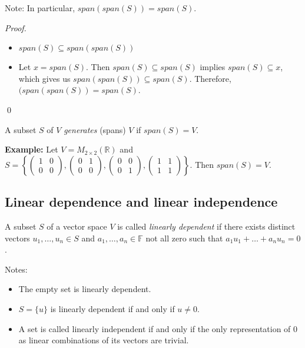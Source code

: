 \documentclass[12pt]{article}
\newenvironment{definition}[2][Definition]{\begin{trivlist}
\item[\hskip \labelsep {\bfseries #1}\hskip \labelsep {\bfseries #2}]}{\end{trivlist}}
\newenvironment{sol}
    {\emph{Proof.}
    }
    {
    \qed
    }
\begin{document}
\noindent Note: In particular, $span(span(S)) = span(S)$.

\begin{sol}
\begin{itemize}
    \item[(a)] $span(S) \subseteq span(span(S))$
    
    \item[(b)] Let $x = span(S)$. Then $span(S) \subseteq span(S)$ implies $span(S) \subseteq x$, which gives us $span(span(S)) \subseteq span(S)$. Therefore, $(span(span(S)) = span(S)$.
\end{itemize}
\end{sol}

\begin{definition}{6}
A subset $S$ of $V$ \textit{generates} (spans) $V$ if $span(S) = V$.
\end{definition}

\noindent\textbf{Example:} Let $V = M_{2 \times 2}(\mathbb{R})$ and $S = \left\{\begin{pmatrix}
1 & 0 \\
0 & 0
\end{pmatrix}, \begin{pmatrix}
0 & 1\\
0 & 0
\end{pmatrix}, 
\begin{pmatrix}
0 & 0\\
0 & 1
\end{pmatrix}, 
\begin{pmatrix}
1 & 1\\
1 & 1
\end{pmatrix}\right\}$. Then $span(S) = V$.

\subsection{Linear dependence and linear independence}

\begin{definition}{7}
A subset $S$ of a vector space $V$ is called \textit{linearly dependent} if there exists distinct vectors $u_1, \dots, u_n \in S$ and $a_1, \dots, a_n \in \mathbb{F}$ not all zero such that $a_1u_1 + \dots + a_nu_n = 0$.
\end{definition}

\noindent Notes:
\begin{itemize}
    \item The empty set is linearly dependent.
    \item $S = \{u\}$ is linearly dependent if and only if $u \neq 0$.
    \item A set is called linearly independent if and only if the only representation of 0 as linear combinations of its vectors are trivial.
\end{itemize}
\end{document}
